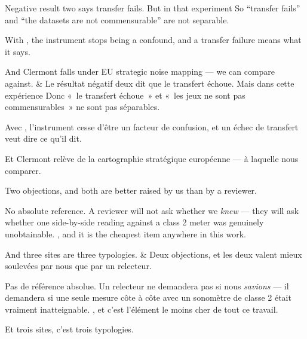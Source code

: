 \documentclass[10pt,a4paper]{article}
\begin{document}
\begin{say}
Negative result two says transfer fails. But in that experiment  So
``transfer fails'' and ``the datasets are not commensurable'' are not separable.

With , the instrument stops being a
confound, and a transfer failure means what it says.

And Clermont falls under EU strategic noise mapping ---  we can compare against.
&
Le résultat négatif deux dit que le transfert échoue. Mais dans cette expérience
 Donc «~le
transfert échoue~» et «~les jeux ne sont pas commensurables~» ne sont pas
séparables.

Avec , l'instrument cesse
d'être un facteur de confusion, et un échec de transfert veut dire ce qu'il dit.

Et Clermont relève de la cartographie stratégique européenne ---  à laquelle nous comparer.
\end{say}

\begin{say}
Two objections, and both are better raised by us than by a reviewer.

No absolute reference. A reviewer will not ask whether we \emph{knew} --- they
will ask whether one side-by-side reading against a class 2 meter was genuinely
unobtainable. , and it is the cheapest
item anywhere in this work.

And three sites are three typologies. 
&
Deux objections, et les deux valent mieux soulevées par nous que par un relecteur.

Pas de référence absolue. Un relecteur ne demandera pas si nous \emph{savions} ---
il demandera si une seule mesure côte à côte avec un sonomètre de classe 2 était
vraiment inatteignable. , et c'est
l'élément le moins cher de tout ce travail.

Et trois sites, c'est trois typologies. 
\end{say}
\end{document}
